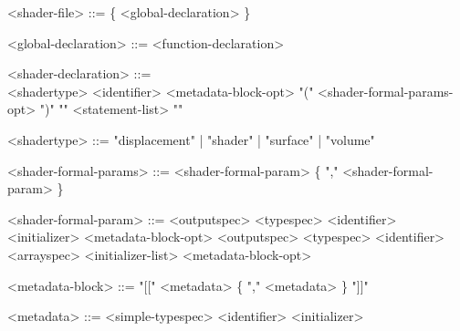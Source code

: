 \documentclass[11pt,letterpaper]{book}
\begin{document}
\begin{grammar}
<shader-file> ::= \{ <global-declaration> \}

<global-declaration> ::= <function-declaration> 

<shader-declaration> ::= \spc \\ 
    <shadertype> <identifier> <metadata-block-opt> 
    "(" <shader-formal-params-opt> ")" "{" <statement-list> "}"

<shadertype> ::= "displacement" |  "shader" | "surface" | "volume"

<shader-formal-params> ::= <shader-formal-param> \{ "," <shader-formal-param> \}

<shader-formal-param> ::= <outputspec> <typespec> <identifier>
                               <initializer> <metadata-block-opt>
\alt <outputspec> <typespec> <identifier> <arrayspec>
          <initializer-list> <metadata-block-opt>

<metadata-block> ::= "[[" <metadata> \{ "," <metadata> \} "]]"

<metadata> ::= <simple-typespec> <identifier> <initializer>

\end{grammar}
\end{document}
